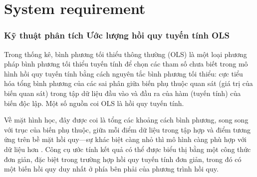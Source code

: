 \part{System requirement}

\section{Kỹ thuật phân tích Ước lượng hồi quy tuyến tính OLS}
Trong thống kê, bình phương tối thiểu thông thường (OLS) là một loại phương pháp bình phương tối thiểu tuyến tính để chọn các tham số chưa biết trong mô hình hồi quy tuyến tính bằng cách nguyên tắc bình phương tối thiểu: cực tiểu hóa tổng bình phương của các sai phân giữa biến phụ thuộc quan sát (giá trị của biến quan sát) trong tập dữ liệu đầu vào và đầu ra của hàm (tuyến tính) của biến độc lập. Một số nguồn coi OLS là hồi quy tuyến tính.

Về mặt hình học, đây được coi là tổng các khoảng cách bình phương, song song với trục của biến phụ thuộc, giữa mỗi điểm dữ liệu trong tập hợp và điểm tương ứng trên bề mặt hồi quy—sự khác biệt càng nhỏ thì mô hình càng phù hợp với dữ liệu hơn . Công cụ ước tính kết quả có thể được biểu thị bằng một công thức đơn giản, đặc biệt trong trường hợp hồi quy tuyến tính đơn giản, trong đó có một biến hồi quy duy nhất ở phía bên phải của phương trình hồi quy.

